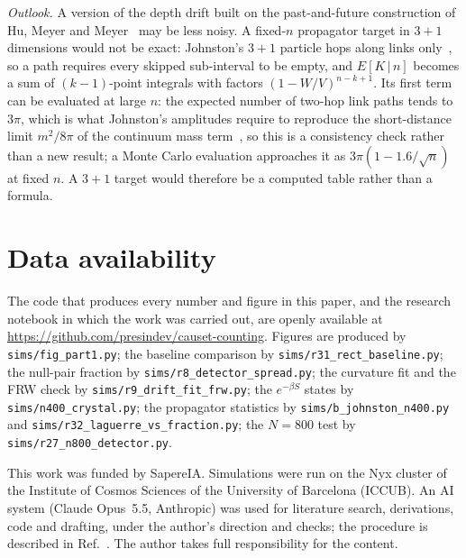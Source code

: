 \documentclass[prd,twocolumn,superscriptaddress,nofootinbib,amsmath,amssymb,floatfix]{revtex4-2}
\begin{document}
\emph{Outlook.} A version of the depth drift built on the past-and-future construction of Hu, Meyer and Meyer~\cite{HMM25} may be less noisy. A fixed-$n$ propagator target in $3+1$ dimensions would not be exact: Johnston's $3+1$ particle hops along links only~\cite{Johnston08}, so a path requires every skipped sub-interval to be empty, and $E[K\,|\,n]$ becomes a sum of $(k-1)$-point integrals with factors $(1-W/V)^{n-k+1}$. Its first term can be evaluated at large $n$: the expected number of two-hop link paths tends to $3\pi$, which is what Johnston's amplitudes require to reproduce the short-distance limit $m^2/8\pi$ of the continuum mass term~\cite{Johnston08}, so this is a consistency check rather than a new result; a Monte Carlo evaluation approaches it as $3\pi(1-1.6/\sqrt n)$ at fixed $n$. A $3+1$ target would therefore be a computed table rather than a formula.

\section*{Data availability}
The code that produces every number and figure in this paper, and the research notebook in which the work was carried out, are openly available at \url{https://github.com/presindev/causet-counting}. Figures are produced by \texttt{sims/fig\_part1.py}; the baseline comparison by \texttt{sims/r31\_rect\_baseline.py}; the null-pair fraction by \texttt{sims/r8\_detector\_spread.py}; the curvature fit and the FRW check by \texttt{sims/r9\_drift\_fit\_frw.py}; the $e^{-\beta S}$ states by \texttt{sims/n400\_crystal.py}; the propagator statistics by \texttt{sims/b\_johnston\_n400.py} and \texttt{sims/r32\_laguerre\_vs\_fraction.py}; the $N=800$ test by \texttt{sims/r27\_n800\_detector.py}.

\begin{acknowledgments}
This work was funded by SapereIA. Simulations were run on the Nyx cluster of the Institute of Cosmos Sciences of the University of Barcelona (ICCUB). An AI system (Claude Opus~5.5, Anthropic) was used for literature search, derivations, code and drafting, under the author's direction and checks; the procedure is described in Ref.~\cite{MethodNote}. The author takes full responsibility for the content.
\end{acknowledgments}

\appendix
\end{document}
